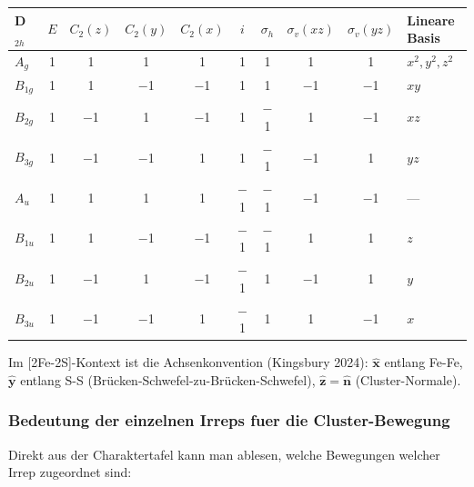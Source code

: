 \documentclass[11pt,a4paper,twoside]{article}
\theoremstyle{remark}
\begin{document}
\begin{center}
\begin{tabular}{lccccccccl}
  \toprule
  \textbf{D$_{2h}$} & $E$ & $C_2(z)$ & $C_2(y)$ & $C_2(x)$ &
                     $i$ & $\sigma_h$ & $\sigma_v(xz)$ & $\sigma_v(yz)$ &
                     \textbf{Lineare Basis} \\
  \midrule
  $A_g$    & 1 & 1 & 1 & 1 & 1 & 1 & 1 & 1 & $x^2, y^2, z^2$ \\
  $B_{1g}$ & 1 & 1 & $-$1 & $-$1 & 1 & 1 & $-$1 & $-$1 & $xy$ \\
  $B_{2g}$ & 1 & $-$1 & 1 & $-$1 & 1 & $-$1 & 1 & $-$1 & $xz$ \\
  $B_{3g}$ & 1 & $-$1 & $-$1 & 1 & 1 & $-$1 & $-$1 & 1 & $yz$ \\
  $A_u$    & 1 & 1 & 1 & 1 & $-$1 & $-$1 & $-$1 & $-$1 & --- \\
  $B_{1u}$ & 1 & 1 & $-$1 & $-$1 & $-$1 & $-$1 & 1 & 1 & $z$ \\
  $B_{2u}$ & 1 & $-$1 & 1 & $-$1 & $-$1 & 1 & $-$1 & 1 & $y$ \\
  $B_{3u}$ & 1 & $-$1 & $-$1 & 1 & $-$1 & 1 & 1 & $-$1 & $x$ \\
  \bottomrule
\end{tabular}
\end{center}

Im [2Fe-2S]-Kontext ist die Achsenkonvention (Kingsbury 2024):
$\hat{\mathbf{x}}$ entlang Fe-Fe, $\hat{\mathbf{y}}$ entlang S-S
(Br\"ucken-Schwefel-zu-Br\"ucken-Schwefel),
$\hat{\mathbf{z}} = \hat{\mathbf{n}}$ (Cluster-Normale).

\subsubsection*{Bedeutung der einzelnen Irreps fuer die Cluster-Bewegung}

Direkt aus der Charaktertafel kann man ablesen, welche Bewegungen
welcher Irrep zugeordnet sind:
\end{document}
